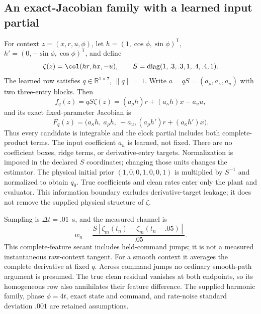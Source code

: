 \subsection{An exact-Jacobian family with a learned input partial}
For context $z=(x,r,u,\phi)$, let $h=(1,\cos\phi,\sin\phi)^{\mathsf T}$,
$h'=(0,-\sin\phi,\cos\phi)^{\mathsf T}$, and define
\begin{equation}
 \zeta(z)=\col(hr,hx,-u),\qquad
 S=\operatorname{diag}(1,.3,.3,1,.4,.4,1).
 \label{eq:nf_features}
\end{equation}
The learned row satisfies $q\in\mathbb R^{1\times7}$, $\|q\|=1$.
Write $a=qS=(a_\rho,a_\kappa,a_u)$ with two three-entry blocks. Then
\begin{equation}
 f_q(z)=qS\zeta(z)=(a_\rho h)r+(a_\kappa h)x-a_u u,
 \label{eq:nf_family}
\end{equation}
and its exact fixed-parameter Jacobian is
\begin{equation}
 F_q(z)=\bigl(a_\kappa h,\ a_\rho h,\ -a_u,
                 (a_\rho h')r+(a_\kappa h')x\bigr).
 \label{eq:nf_jacobian}
\end{equation}
Thus every candidate is integrable and the clock partial includes both
complete-product terms. The input coefficient $a_u$ is learned, not fixed.
There are no coefficient boxes, ridge terms, or derivative-entry targets.
Normalization is imposed in the declared $S$ coordinates; changing those
units changes the estimator. The physical initial prior
$(1,0,0,1,0,0,1)$ is multiplied by $S^{-1}$ and normalized to obtain $q_0$.
True coefficients and clean rates enter only the plant and evaluator.
This information boundary excludes derivative-target leakage; it does not
remove the supplied physical structure of $\zeta$.

Sampling is $\Delta t=.01$~s, and the measured channel is
\begin{equation}
 w_n=\frac{S[\zeta_m(t_n)-\zeta_m(t_n-.05)]}{.05}.
 \label{eq:nf_secant}
\end{equation}
This complete-feature secant includes held-command jumps; it is not a
measured instantaneous raw-context tangent. For a smooth context it averages
the complete derivative at fixed $q$. Across command jumps no ordinary
smooth-path argument is presumed. The true clean residual vanishes at both
endpoints, so its homogeneous row also annihilates their feature difference.
The supplied harmonic family, phase $\phi=4t$, exact state and command,
and rate-noise standard deviation $.001$ are retained assumptions.


